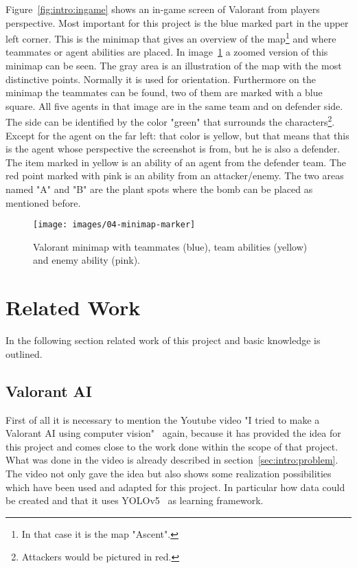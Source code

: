Figure~\ref{fig:intro:ingame} shows an in-game screen of Valorant from players perspective. Most 
important for this project is the blue marked part in the upper left corner. This is the minimap that 
gives an overview of the map\footnote{In that case it is the map "Ascent".} and where teammates or 
agent abilities are placed. In image~\ref{fig:intro:minimap} a zoomed version of this minimap can be 
seen. The gray area is an illustration of the map with the most distinctive points. Normally it is used 
for orientation. Furthermore on the minimap the teammates can be found, two of them are marked 
with a blue square. All five agents in that image are in the same team and on defender side. The side 
can be identified by the color "green" that surrounds the characters\footnote{Attackers would be 
pictured in red.}.  Except for the agent on the far left: that color is yellow, but that means that this is 
the agent whose perspective the screenshot is from, but he is also a defender. The item marked in 
yellow is an ability of an agent from the defender team. The red point marked with pink is an ability 
from an attacker/enemy. The two areas named "A" and "B" are the plant spots where the bomb can 
be placed as mentioned before.

\begin{figure}
	\centering
	\texttt{[image: images/04-minimap-marker]}
	\caption[Valorant minimap]{Valorant minimap with teammates (blue), team abilities (yellow) and 
	enemy ability (pink).}
	\label{fig:intro:minimap}
\end{figure}


\section{Related Work}\label{sec:intro:relatedWork}

In the following section related work of this project and basic knowledge is outlined.

\subsection[Video: Valorant AI]{Valorant AI}\label{subsec:intro:video}

First of all it is necessary to mention the Youtube video "I tried to make a Valorant AI using computer 
vision"~\cite{river2021} again, because it has provided the idea for this project and comes close to 
the work done within the scope of that project. What was done in the video is already described in 
section~\ref{sec:intro:problem}. The video not only gave the idea but also shows some realization 
possibilities which have been used and adapted for this project. In particular how data could be 
created and that it uses YOLOv5~\cite{jocher2020} as learning framework.

